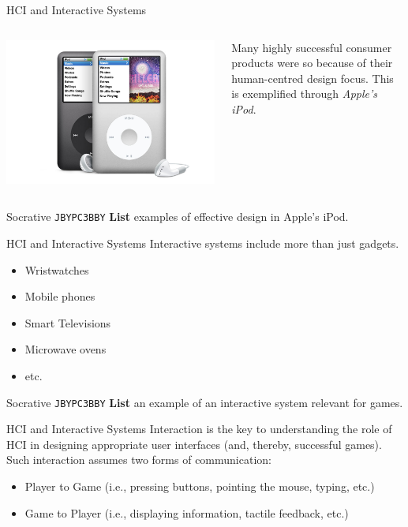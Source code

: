 \begin{frame}{HCI and Interactive Systems}
	\begin{columns}[onlytextwidth]
		\begin{column}{0.45\textwidth}
			\includegraphics[height=14ex]{IPod.jpg}
		\end{column}
		\begin{column}{0.45\textwidth}
			Many highly successful consumer products were so because of their human-centred design focus. This
			is exemplified through \textit{Apple's iPod}.
		\end{column}
	\end{columns}
\end{frame}

\begin{frame}[fragile]{Socrative \texttt{JBYPC3BBY}}
    \textbf{List} examples of effective design in Apple's iPod.
\end{frame}

\begin{frame}{HCI and Interactive Systems}
	Interactive systems include more than just gadgets.
	\begin{itemize}
		\item Wristwatches
		\item Mobile phones
		\item Smart Televisions
		\item Microwave ovens
		\item etc.
	\end{itemize}
\end{frame}

\begin{frame}[fragile]{Socrative \texttt{JBYPC3BBY}}
    \textbf{List} an example of an interactive system relevant for games.
\end{frame}

\begin{frame}{HCI and Interactive Systems}
	Interaction is the key to understanding the role of HCI in designing appropriate user interfaces (and, thereby, successful games). 
	Such interaction assumes two forms of communication:
	\begin{itemize}
		\item Player to Game (i.e., pressing buttons, pointing the mouse, typing, etc.)
		\item Game to Player (i.e., displaying information, tactile feedback, etc.)
	\end{itemize}
\end{frame}

